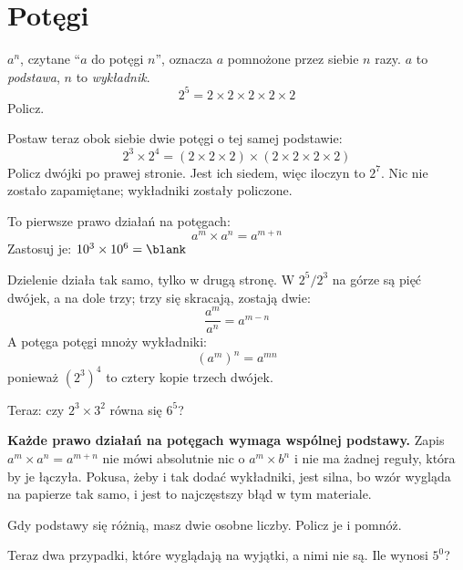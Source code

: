 \section{Potęgi}
\label{sec:F01-powers}

\begin{fr}
$a^{n}$, czytane \enquote{$a$ do potęgi $n$}, oznacza $a$ pomnożone przez
siebie $n$ razy. $a$ to \emph{podstawa}, $n$ to \emph{wykładnik}.
\[ 2^{5} = 2 \times 2 \times 2 \times 2 \times 2 \]
Policz.
\nextframe
\end{fr}

\begin{fr}
Postaw teraz obok siebie dwie potęgi o tej samej podstawie:
\[ 2^{3} \times 2^{4} = (2\times2\times2) \times (2\times2\times2\times2) \]
Policz dwójki po prawej stronie. Jest ich siedem, więc iloczyn to $2^{7}$. Nic
nie zostało zapamiętane; wykładniki zostały policzone.

To pierwsze prawo działań na potęgach:
\[ a^{m} \times a^{n} = a^{m+n} \]
Zastosuj je: $10^{3} \times 10^{6} = \blank$
\nextframe
\end{fr}

\begin{fr}
Dzielenie działa tak samo, tylko w drugą stronę. W $2^{5} / 2^{3}$ na górze są
pięć dwójek, a na dole trzy; trzy się skracają, zostają dwie:
\[ \frac{a^{m}}{a^{n}} = a^{m-n} \]
A potęga potęgi mnoży wykładniki:
\[ (a^{m})^{n} = a^{mn} \]
ponieważ $(2^{3})^{4}$ to cztery kopie trzech dwójek.

Teraz: czy $2^{3} \times 3^{2}$ równa się $6^{5}$?
\nextframe
\end{fr}

\begin{fr}
\begin{trapbox}
\textbf{Każde prawo działań na potęgach wymaga wspólnej podstawy.} Zapis
$a^{m}\times a^{n} = a^{m+n}$ nie mówi absolutnie nic o $a^{m} \times b^{n}$ i
nie ma żadnej reguły, która by je łączyła. Pokusa, żeby i tak dodać wykładniki,
jest silna, bo wzór wygląda na papierze tak samo, i jest to najczęstszy błąd w
tym materiale.

Gdy podstawy się różnią, masz dwie osobne liczby. Policz je i pomnóż.
\end{trapbox}
Teraz dwa przypadki, które wyglądają na wyjątki, a nimi nie są. Ile wynosi
$5^{0}$?
\nextframe
\end{fr}

